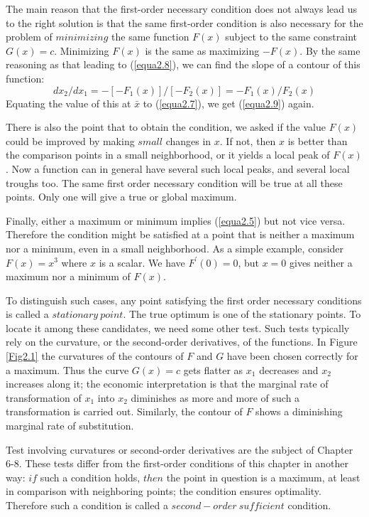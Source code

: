 The main reason that the first-order necessary condition does not always lead us to the right solution is that the same first-order condition is also necessary for the problem of $minimizing$ the same function $F(x)$ subject to the same constraint $G(x)=c$. Minimizing $F(x)$ is the same as maximizing $-F(x)$. By the same reasoning as that leading to (\ref{equa2.8}), we can find the slope of a contour of this function:
\begin{equation*}
dx_2 / dx_1 = - [ -F_1(x)] /[ -F_2(x) ] = - F_1(x) / F_2(x)
\end{equation*}
Equating the value of this at $\bar{x}$ to (\ref{equa2.7}), we get (\ref{equa2.9}) again.

There is also the point that to obtain the condition, we asked if the value $F(x)$ could be improved by making $small$ changes in $x$. If not, then $x$ is better than the comparison points in a small neighborhood, or it yields a local peak of $F(x)$. Now a function can in general have several such local peaks, and several local troughs too. The same first order necessary condition will be true at all these points. Only one will give a true or global maximum.

Finally, either a maximum or minimum implies (\ref{equa2.5}) but not vice versa. Therefore the condition might be satisfied at a point that is neither a maximum nor a minimum, even in a small neighborhood. As a simple example, consider $F(x)= x^3$ where  $x$ is a scalar. We have $F^\prime(0) = 0$, but $x=0$ gives neither a maximum nor a minimum of $F(x)$.

To distinguish such cases, any point satisfying the first order necessary conditions is called a $stationary \ point$. The true optimum is one of the stationary points. To locate it among these candidates, we need some other test. Such tests typically rely on the curvature, or the second-order derivatives, of the functions. In Figure \ref{Fig2.1} the curvatures of the contours of $F$ and $G$ have been chosen correctly for a maximum. Thus the curve $G(x)=c$ gets flatter as $x_1$ decreases and $x_2$ increases along it; the economic interpretation is that the marginal rate of transformation of $x_1$ into $x_2$ diminishes as more and more of such a transformation is carried out. Similarly, the contour of $F$ shows a diminishing marginal rate of substitution.

Test involving curvatures or second-order derivatives are the subject of Chapter 6-8. These tests differ from the first-order conditions of this chapter in another way: $if$ such a condition holds, $then$ the point in question is a maximum, at least in comparison with neighboring points; the condition ensures optimality. Therefore such a condition is called a $second-order \ sufficient$ condition.


